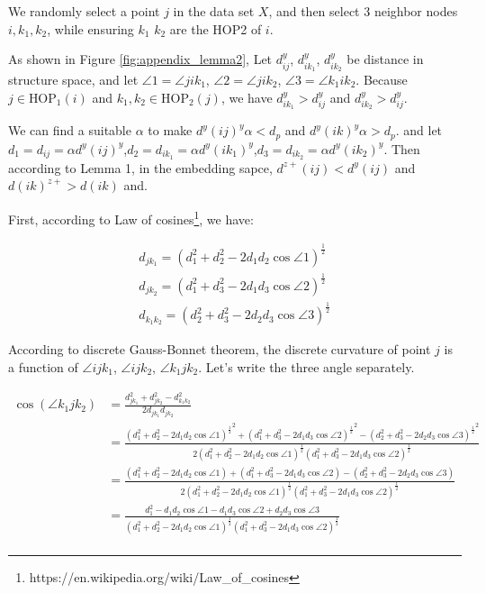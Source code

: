 We randomly select a point $j$ in the data set $X$, and then select 3 neighbor nodes $i,k_1,k_2$, while ensuring $k_1$ $k_2$ are the HOP2 of $i$.

As shown in Figure \ref{fig:appendix_lemma2},  Let $d_{ij}^y$, $d_{ik_1}^y$, $d_{ik_2}^y$ be distance in structure space,
and let $\angle 1=\angle jik_1$, $\angle 2=\angle jik_2$, $\angle 3=\angle k_1ik_2$. 
Because $j \in \text{HOP}_1(i)$ and $k_1, k_2 \in \text{HOP}_2(j)$, we have $d_{ik_1}^y>d_{ij}^y$ and $d_{ik_2}^y>d_{ij}^y$. 


We can find a suitable $\alpha$ to make $d^y(ij)^y\alpha < d_p$ and $d^y(ik)^y\alpha > d_p$.
and let $d_1 = d_{ij}=\alpha d^y(ij)^y$,$d_2 = d_{ik_1}=\alpha d^y(ik_1)^y$,$d_3 = d_{ik_2}=\alpha d^y(ik_2)^y$.
Then according to Lemma 1, in the embedding sapce, $d^{z+}(ij)<d^y(ij)$ and $d(ik)^{z+}>d(ik)$ and.

First, according to Law of cosines\footnote{https://en.wikipedia.org/wiki/Law\_of\_cosines}, we have:

\begin{equation}
  \begin{aligned}
    d_{jk_1} = (d_1^2+d_2^2-2 d_1 d_2 \cos\angle1 )^\frac{1}{2}\\
    d_{jk_2} = (d_1^2+d_3^2-2 d_1 d_3 \cos\angle2 )^\frac{1}{2}\\
    d_{k_1k_2} = (d_2^2+d_3^2-2 d_2 d_3 \cos\angle3 )^\frac{1}{2}
\end{aligned}
\end{equation}

According to discrete Gauss-Bonnet theorem, the discrete curvature of point $j$ is a function of $\angle ijk_1$, $\angle ijk_2$, $\angle k_1jk_2$. Let's write the three angle separately.

\begin{equation}
  \begin{aligned}
    \cos(\angle k_1jk_2)
    &= \frac{d_{jk_1}^2 + d_{jk_2}^2 -d_{k_1k_2}^2}{2d_{jk_1} d_{jk_2}}\\
    &= \frac
    {
      {(d_1^2+d_2^2-2 d_1 d_2 \cos\angle1 )^\frac{1}{2}}^2 
      +
      {(d_1^2+d_3^2-2 d_1 d_3 \cos\angle2 )^\frac{1}{2}}^2 
      -
      {(d_2^2+d_3^2-2 d_2 d_3 \cos\angle3 )^\frac{1}{2}}^2
    }{
      2
      {(d_1^2+d_2^2-2 d_1 d_2 \cos\angle1 )^\frac{1}{2}}
      {(d_1^2+d_3^2-2 d_1 d_3 \cos\angle2 )^\frac{1}{2}}
    }\\
    &= \frac
    {
      {(d_1^2+d_2^2-2 d_1 d_2 \cos\angle1 )}
      +
      {(d_1^2+d_3^2-2 d_1 d_3 \cos\angle2 )}
      -
      {(d_2^2+d_3^2-2 d_2 d_3 \cos\angle3 )}
    }{
      2
      {(d_1^2+d_2^2-2 d_1 d_2 \cos\angle1 )^\frac{1}{2}}
      {(d_1^2+d_3^2-2 d_1 d_3 \cos\angle2 )^\frac{1}{2}}
    }\\
    &= \frac
    {
      d_1^2
      -
      d_1d_2 \cos\angle1 
      -
      d_1d_3 \cos\angle2 
      +
      d_2d_3 \cos\angle3 
    }{
      {(d_1^2+d_2^2-2 d_1 d_2 \cos\angle1 )^\frac{1}{2}}
      {(d_1^2+d_3^2-2 d_1 d_3 \cos\angle2 )^\frac{1}{2}}
    }\\
\end{aligned}
\end{equation}







